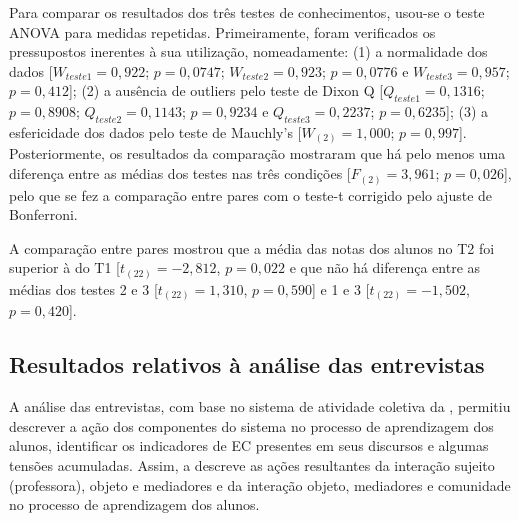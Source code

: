 \documentclass[portuguese]{textolivre}
\begin{document}
Para comparar os resultados dos três testes de conhecimentos, usou-se o teste ANOVA para medidas repetidas. Primeiramente, foram verificados os pressupostos inerentes à sua utilização, nomeadamente: (1) a normalidade dos dados [$W_{teste 1}=0,922$; $p=0,0747$; $W_{teste 2}=0,923$; $p=0,0776$ e $W_{teste 3}=0,957$; $p=0,412$]; (2) a ausência de outliers pelo teste de Dixon Q [$Q_{teste 1}=0,1316$; $p=0,8908$; $Q_{teste 2}=0,1143$; $p=0,9234$ e $Q_{teste 3}=0,2237$; $p=0,6235$]; (3) a esfericidade dos dados pelo teste de Mauchly's [$W_{(2)}=1,000$; $p=0,997$]. Posteriormente, os resultados da comparação mostraram que há pelo menos uma diferença entre as médias dos testes nas três condições [$F_{(2)}=3,961$; $p=0,026$], pelo que se fez a comparação entre pares com o teste-t corrigido pelo ajuste de Bonferroni. 

A comparação entre pares mostrou que a média das notas dos alunos no T2 foi superior à do T1 [$t_{(22)}=-2,812$, $p=0,022$ e que não há diferença entre as médias dos testes 2 e 3 [$t_{(22)}=1,310$, $p=0,590$] e 1 e 3 [$t_{(22)}=-1,502$, $p=0,420$].


\subsection{Resultados relativos à análise das entrevistas}\label{sec-modelo}
A análise das entrevistas, com base no sistema de atividade coletiva da , permitiu descrever a ação dos componentes do sistema no processo de aprendizagem dos alunos, identificar os indicadores de EC presentes em seus discursos e algumas tensões acumuladas. Assim, a  descreve as ações resultantes da interação sujeito (professora), objeto e mediadores e da interação objeto, mediadores e comunidade no processo de aprendizagem dos alunos. 
\end{document}
